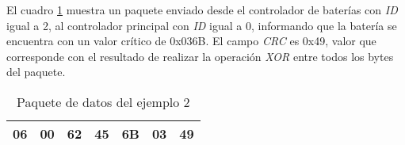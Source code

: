\documentclass[a4paper,10pt]{article}
\begin{document}
El cuadro \ref{paquete_ejemplo2} muestra un paquete enviado desde el controlador de bater\'ias con \emph{ID} igual a 2,
al controlador principal con \emph{ID} igual a 0, informando que la bater\'ia se encuentra con un valor cr\'itico de 0x036B.
El campo \emph{CRC} es 0x49, valor que corresponde con el resultado de realizar la operaci\'on \emph{XOR} entre
todos los bytes del paquete.

\begin{table}[h]
\begin{center}
\begin{tabular}{|c|c|c|c|c|c|c|}
\hline
06 & 00 & 62 & 45 & 6B & 03 & 49 \\
\hline
\end{tabular}
\caption{Paquete de datos del ejemplo 2}
\label{paquete_ejemplo2}
\end{center}
\end{table}
\end{document}
